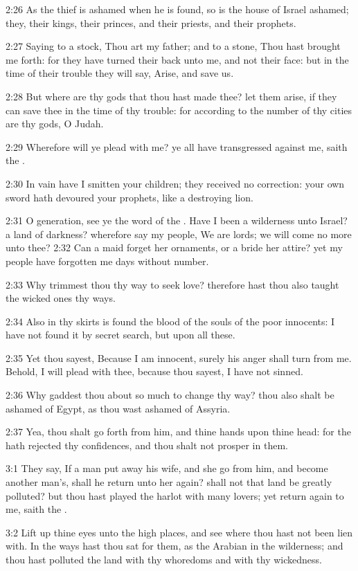 2:26 As the thief is ashamed when he is found, so is the house of
Israel ashamed; they, their kings, their princes, and their priests,
and their prophets.

2:27 Saying to a stock, Thou art my father; and to a stone, Thou hast
brought me forth: for they have turned their back unto me, and not
their face: but in the time of their trouble they will say, Arise, and
save us.

2:28 But where are thy gods that thou hast made thee? let them arise,
if they can save thee in the time of thy trouble: for according to the
number of thy cities are thy gods, O Judah.

2:29 Wherefore will ye plead with me? ye all have transgressed against
me, saith the \LORD.

2:30 In vain have I smitten your children; they received no
correction: your own sword hath devoured your prophets, like a
destroying lion.

2:31 O generation, see ye the word of the \LORD. Have I been a
wilderness unto Israel? a land of darkness? wherefore say my people,
We are lords; we will come no more unto thee?  2:32 Can a maid forget
her ornaments, or a bride her attire? yet my people have forgotten me
days without number.

2:33 Why trimmest thou thy way to seek love? therefore hast thou also
taught the wicked ones thy ways.

2:34 Also in thy skirts is found the blood of the souls of the poor
innocents: I have not found it by secret search, but upon all these.

2:35 Yet thou sayest, Because I am innocent, surely his anger shall
turn from me. Behold, I will plead with thee, because thou sayest, I
have not sinned.

2:36 Why gaddest thou about so much to change thy way? thou also shalt
be ashamed of Egypt, as thou wast ashamed of Assyria.

2:37 Yea, thou shalt go forth from him, and thine hands upon thine
head: for the \LORD hath rejected thy confidences, and thou shalt not
prosper in them.

3:1 They say, If a man put away his wife, and she go from him, and
become another man's, shall he return unto her again? shall not that
land be greatly polluted? but thou hast played the harlot with many
lovers; yet return again to me, saith the \LORD.

3:2 Lift up thine eyes unto the high places, and see where thou hast
not been lien with. In the ways hast thou sat for them, as the Arabian
in the wilderness; and thou hast polluted the land with thy whoredoms
and with thy wickedness.

